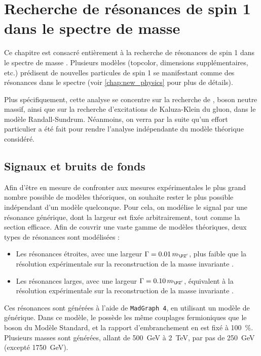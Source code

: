 \chapter{Recherche de résonances de spin 1 dans le spectre de masse \ttbar} \label{chap:zprime}

Ce chapitre est consacré entièrement à la recherche de résonances de spin 1 dans le spectre de masse \ttbar. Plusieurs modèles (topcolor, dimensions supplémentaires, etc.) prédisent de nouvelles particules de spin 1 se manifestant comme des résonances dans le spectre \mtt (voir \cref{chap:new_physics} pour plus de détails).

\bigskip

Plus spécifiquement, cette analyse se concentre sur la recherche de \zprime, boson neutre massif, ainsi que sur la recherche d'excitations de Kaluza-Klein du gluon, dans le modèle Randall-Sundrum. Néanmoins, on verra par la suite qu'un effort particulier a été fait pour rendre l'analyse indépendante du modèle théorique considéré.

\section{Signaux et bruits de fonds}

Afin d'être en mesure de confronter aux mesures expérimentales le plus grand nombre possible de modèles théoriques, on souhaite rester le plus possible indépendant d'un modèle quelconque. Pour cela, on modélise le signal par une résonance générique, dont la largeur est fixée arbitrairement, tout comme la section efficace. Afin de couvrir une vaste gamme de modèles théoriques, deux types de résonances sont modélisées :
\begin{itemize}
    \item Les résonances étroites, avec une largeur $\Gamma = \num{0.01} \, \mzp$, plus faible que la résolution expérimentale sur la reconstruction de la masse invariante \ttbar.
    \item Les résonances larges, avec une largeur $\Gamma = \num{0.10} \, \mzp$, équivalent à la résolution expérimentale sur la reconstruction de la masse invariante \ttbar.
\end{itemize}

Ces résonances sont générées à l'aide de \texttt{MadGraph 4}, en utilisant un modèle de \zprime générique. Dans ce modèle, le \zprime possède les même couplages fermioniques que le boson \PZ du Modèle Standard, et la rapport d'embranchement en \ttbar est fixé à \SI{100}{\%}. Plusieurs masses sont générées, allant de \SI{500}{\GeV} à \SI{2}{\TeV}, par pas de \SI{250}{\GeV} (excepté \SI{1750}{\GeV}).

